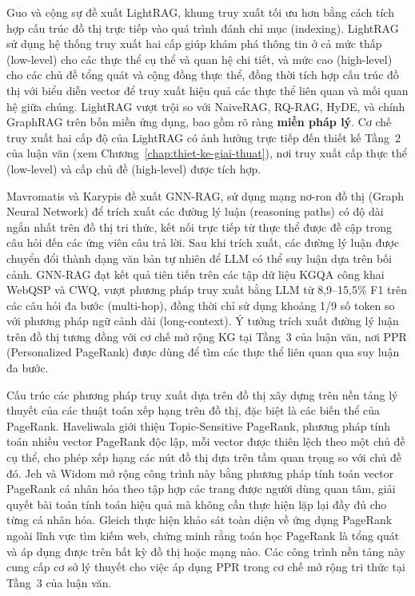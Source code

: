 Guo và cộng sự \cite{guo2025lightrag} đề xuất LightRAG, khung truy xuất tối ưu hơn
bằng cách tích hợp cấu trúc đồ thị trực tiếp vào quá trình đánh chỉ mục (indexing).
LightRAG sử dụng hệ thống truy xuất hai cấp giúp khám phá thông tin ở cả mức thấp
(low-level) cho các thực thể cụ thể và quan hệ chi tiết, và mức cao (high-level)
cho các chủ đề tổng quát và cộng đồng thực thể, đồng thời tích hợp cấu trúc đồ thị
với biểu diễn vector để truy xuất hiệu quả các thực thể liên quan và mối quan hệ
giữa chúng. LightRAG vượt trội so với NaiveRAG, RQ-RAG, HyDE, và chính GraphRAG
trên bốn miền ứng dụng, bao gồm rõ ràng \textbf{miền pháp lý}. Cơ chế truy xuất
hai cấp độ của LightRAG có ảnh hưởng trực tiếp đến thiết kế Tầng~2 của luận văn
(xem Chương~\ref{chap:thiet-ke-giai-thuat}), nơi truy xuất cấp thực thể
(low-level) và cấp chủ đề (high-level) được tích hợp.

\begin{sloppypar}
Mavromatis và Karypis \cite{mavromatis2024gnnrag} đề xuất GNN-RAG, sử dụng mạng
nơ-ron đồ thị (Graph Neural Network) để trích xuất các đường lý luận
(reasoning paths) có độ dài ngắn nhất trên đồ thị tri thức, kết nối trực tiếp từ
thực thể được đề cập trong câu hỏi đến các ứng viên câu trả lời. Sau khi trích
xuất, các đường lý luận được chuyển đổi thành dạng văn bản tự nhiên để LLM có thể
suy luận dựa trên bối cảnh. GNN-RAG đạt kết quả tiên tiến trên các tập dữ liệu
KGQA công khai WebQSP và CWQ, vượt phương pháp truy xuất bằng LLM từ
8,9--15,5\% F1 trên các câu hỏi đa bước (multi-hop), đồng thời chỉ sử dụng khoảng
1/9 số token so với phương pháp ngữ cảnh dài (long-context). Ý tưởng trích xuất
đường lý luận trên đồ thị tương đồng với cơ chế mở rộng KG tại Tầng~3 của luận
văn, nơi PPR (Personalized PageRank) được dùng để tìm các thực thể liên quan qua
suy luận đa bước.
\end{sloppypar}

Cấu trúc các phương pháp truy xuất dựa trên đồ thị xây dựng trên nền tảng lý
thuyết của các thuật toán xếp hạng trên đồ thị, đặc biệt là các biến thể của
PageRank. Haveliwala \cite{haveliwala2002ppr} giới thiệu Topic-Sensitive PageRank,
phương pháp tính toán nhiều vector PageRank độc lập, mỗi vector được thiên lệch
theo một chủ đề cụ thể, cho phép xếp hạng các nút đồ thị dựa trên tầm quan trọng
so với chủ đề đó. Jeh và Widom \cite{jeh2003ppr} mở rộng công trình này bằng
phương pháp tính toán vector PageRank cá nhân hóa theo tập hợp các trang được người
dùng quan tâm, giải quyết bài toán tính toán hiệu quả mà không cần thực hiện lặp
lại đầy đủ cho từng cá nhân hóa. Gleich \cite{gleich2015pagerank} thực hiện khảo
sát toàn diện về ứng dụng PageRank ngoài lĩnh vực tìm kiếm web, chứng minh rằng
toán học PageRank là tổng quát và áp dụng được trên bất kỳ đồ thị hoặc mạng nào.
Các công trình nền tảng này cung cấp cơ sở lý thuyết cho việc áp dụng PPR trong
cơ chế mở rộng tri thức tại Tầng~3 của luận văn.

